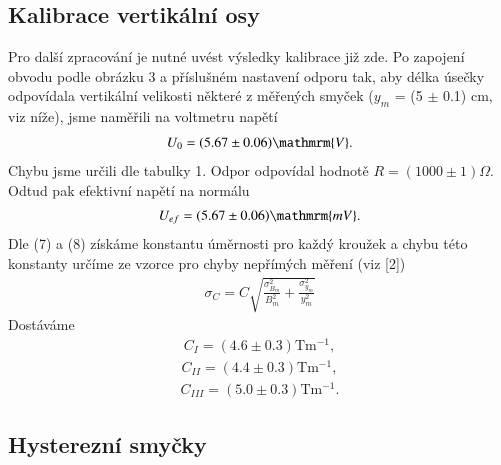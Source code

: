 \documentclass{article}
\begin{document}
\subsection{Kalibrace vertikální osy}
\par Pro další zpracování je nutné uvést výsledky kalibrace již zde. Po zapojení obvodu podle obrázku 3 a příslušném nastavení odporu tak, aby délka úsečky odpovídala vertikální velikosti některé z měřených smyček ($y_m$ = (5 $\pm$ 0.1) cm, viz níže), jsme naměřili na voltmetru napětí
\begin{align*}
    U_0 = (5.67 \pm 0.06) \mathmrm{V}.
\end{align*}
Chybu jsme určili dle tabulky 1. Odpor odpovídal hodnotě $R = (1000 \pm 1) \Omega$. Odtud pak efektivní napětí na normálu
\begin{align*}
    U_{ef} = (5.67 \pm 0.06) \mathmrm{mV}.
\end{align*}
Dle (7) a (8) získáme konstantu úměrnosti pro každý kroužek a chybu této konstanty určíme ze vzorce pro chyby nepřímých měření (viz [2])
\begin{align}
    \sigma_C = C\sqrt{\frac{\sigma^2_{B_m}}{B^2_m} + \frac{\sigma^2_{y_m}}{y^2_m} }
\end{align}
Dostáváme
\begin{align*}
    C_{I} = (4.6 \pm 0.3)\mathrm{Tm^{-1}},
\end{align*}
\begin{align*}
    C_{II} = (4.4 \pm 0.3)\mathrm{Tm^{-1}},
\end{align*}
\begin{align*}
    C_{III} = (5.0 \pm 0.3)\mathrm{Tm^{-1}}.
\end{align*}

\subsection{Hysterezní smyčky}
\end{document}
